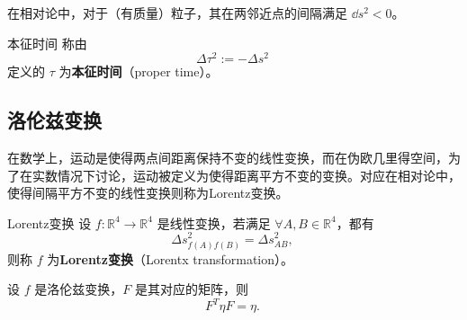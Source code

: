 在相对论中，对于（有质量）粒子，其在两邻近点的间隔满足 $\dd s^2<0$。
\begin{definition}{本征时间}
称由
\begin{equation}
\Delta \tau^2:=-\Delta s^2~
\end{equation}
定义的 $\tau$ 为\textbf{本征时间}（proper time）。
\end{definition}

\subsection{洛伦兹变换}
在数学上，运动是使得两点间距离保持不变的线性变换，而在伪欧几里得空间，为了在实数情况下讨论，运动被定义为使得距离平方不变的变换。对应在相对论中，使得间隔平方不变的线性变换则称为Lorentz变换。
\begin{definition}{Lorentz变换}
设 $f:\mathbb R^4\rightarrow\mathbb R^4$ 是线性变换，若满足 $\forall A,B\in\mathbb R^4$，都有
\begin{equation}
\Delta s^2_{f(A)f(B)}=\Delta s^2_{AB},~
\end{equation}
则称 $f$ 为\textbf{Lorentz变换}（Lorentx transformation）。
\end{definition}

\begin{theorem}{}
设 $f$ 是洛伦兹变换，$F$ 是其对应的矩阵，则
\begin{equation}
F^T\eta F=\eta.~
\end{equation} 
\end{theorem}





















